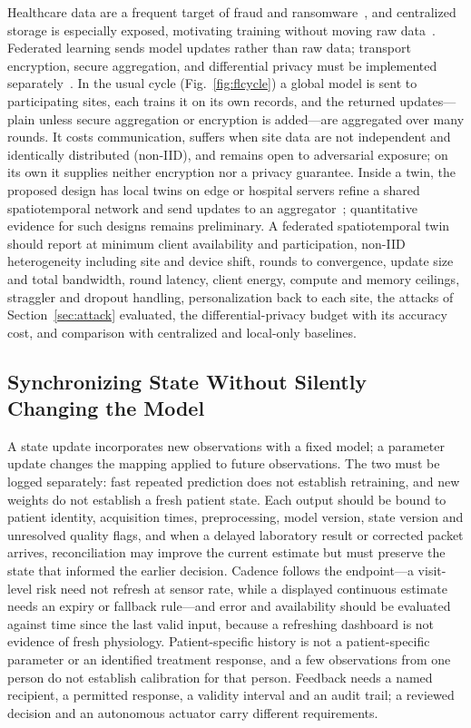 \documentclass[journal]{IEEEtran}
\begin{document}
Healthcare data are a frequent target of fraud and ransomware~\cite{Seh2020HealthcareDataBreaches}, and centralized storage is especially exposed, motivating training without moving raw data~\cite{rieke2020digitalhealth}. Federated learning sends model updates rather than raw data; transport encryption, secure aggregation, and differential privacy must be implemented separately~\cite{aouedi2022FLmedical}. In the usual cycle (Fig.~\ref{fig:flcycle}) a global model is sent to participating sites, each trains it on its own records, and the returned updates---plain unless secure aggregation or encryption is added---are aggregated over many rounds. It costs communication, suffers when site data are not independent and identically distributed (non-IID), and remains open to adversarial exposure; on its own it supplies neither encryption nor a privacy guarantee. Inside a twin, the proposed design has local twins on edge or hospital servers refine a shared spatiotemporal network and send updates to an aggregator~\cite{aouedi2022FLmedical,nguyen2022FLsmarthealthcare}; quantitative evidence for such designs remains preliminary. A federated spatiotemporal twin should report at minimum client availability and participation, non-IID heterogeneity including site and device shift, rounds to convergence, update size and total bandwidth, round latency, client energy, compute and memory ceilings, straggler and dropout handling, personalization back to each site, the attacks of Section~\ref{sec:attack} evaluated, the differential-privacy budget with its accuracy cost, and comparison with centralized and local-only baselines.

\subsection{Synchronizing State Without Silently Changing the Model}
\label{sec:synchronization}
\label{sec:federatedstate}
A state update incorporates new observations with a fixed model; a parameter update changes the mapping applied to future observations. The two must be logged separately: fast repeated prediction does not establish retraining, and new weights do not establish a fresh patient state. Each output should be bound to patient identity, acquisition times, preprocessing, model version, state version and unresolved quality flags, and when a delayed laboratory result or corrected packet arrives, reconciliation may improve the current estimate but must preserve the state that informed the earlier decision. Cadence follows the endpoint---a visit-level risk need not refresh at sensor rate, while a displayed continuous estimate needs an expiry or fallback rule---and error and availability should be evaluated against time since the last valid input, because a refreshing dashboard is not evidence of fresh physiology. Patient-specific history is not a patient-specific parameter or an identified treatment response, and a few observations from one person do not establish calibration for that person. Feedback needs a named recipient, a permitted response, a validity interval and an audit trail; a reviewed decision and an autonomous actuator carry different requirements.
\end{document}
